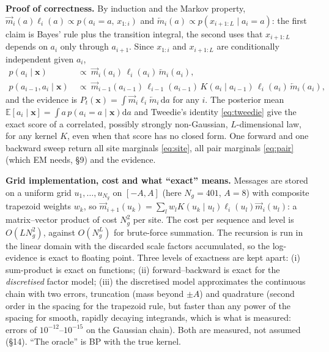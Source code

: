 \textbf{Proof of correctness.} By induction and the Markov property, $\overrightarrow m_i(a)\ell_i(a)\propto p(a_i{=}a,\,x_{1:i})$ and $\overleftarrow m_i(a)\propto p(x_{i+1:L}\mid a_i{=}a)$: the first
claim is Bayes' rule plus the transition integral, the second uses that $x_{i+1:L}$ depends on $a_i$ only through $a_{i+1}$. Since $x_{1:i}$ and $x_{i+1:L}$ are conditionally independent given $a_i$,
\begin{align}
p(a_i\mid\mathbf x)&\ \propto\ \overrightarrow m_i(a_i)\,\ell_i(a_i)\,\overleftarrow m_i(a_i),\label{eq:site}\\
p(a_{i-1},a_i\mid\mathbf x)&\ \propto\ \overrightarrow m_{i-1}(a_{i-1})\,\ell_{i-1}(a_{i-1})\,K(a_i\mid a_{i-1})\,\ell_i(a_i)\,\overleftarrow m_i(a_i),\label{eq:pair}
\end{align}
and the evidence is $P_t(\mathbf x)=\int\overrightarrow m_i\ell_i\overleftarrow m_i\,\mathrm da$ for any $i$. The posterior mean $\mathbb E[a_i\mid\mathbf x]=\int a\,p(a_i{=}a\mid\mathbf x)\mathrm da$ and
Tweedie's identity \eqref{eq:tweedie} give the exact score of a correlated, possibly strongly non-Gaussian, $L$-dimensional law, for any kernel $K$, even when that score has no closed form.
One forward and one backward sweep return all site marginals \eqref{eq:site}, all pair marginals \eqref{eq:pair} (which EM needs, \S9) and the evidence.

\textbf{Grid implementation, cost and what ``exact'' means.} Messages are stored on a uniform grid $u_1,\dots,u_{N_g}$ on $[-A,A]$ (here $N_g=401$, $A=8$) with composite trapezoid weights $w_k$, so
$\overrightarrow m_{i+1}(u_k)=\sum_lw_lK(u_k\mid u_l)\ell_i(u_l)\overrightarrow m_i(u_l)$: a matrix--vector product of cost $N_g^2$ per site. The cost per sequence and level is
$O(LN_g^2)$, against $O(N_g^L)$ for brute-force summation. The recursion is run in the linear domain with the discarded scale factors accumulated, so the log-evidence is exact to floating point. Three levels of exactness are kept
apart: (i) sum-product is exact on functions; (ii) forward--backward is exact for the \emph{discretised} factor model; (iii) the discretised model approximates the continuous chain with two errors, truncation (mass beyond
$\pm A$) and quadrature (second order in the spacing for the trapezoid rule, but faster than any power of the spacing for smooth, rapidly decaying integrands, which is what is measured: errors of $10^{-12}$--$10^{-15}$ on the Gaussian chain).
Both are measured, not assumed (\S14). ``The oracle'' is BP with the true kernel.

